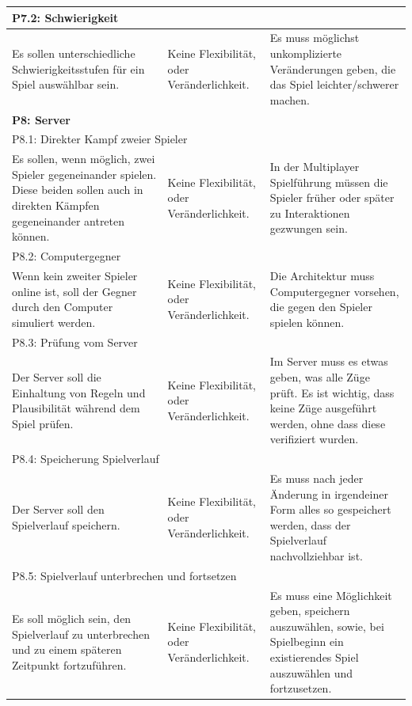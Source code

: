 \documentclass[fontsize=12pt,paper=a4,twoside]{scrartcl}
\begin{document}
\begin{longtable}[c]{|p{5cm}|p{5cm}|p{5cm}|}
\\ \hline
\multicolumn{3}{|l|}{{P7.2: Schwierigkeit}} 
\\ \hline
Es sollen unterschiedliche Schwierigkeitsstufen für ein Spiel auswählbar sein. & Keine Flexibilität, oder Veränderlichkeit.    & Es muss möglichst unkomplizierte Veränderungen geben, die das Spiel leichter/schwerer machen. 
\\ \hline
%
\multicolumn{3}{|l|}{{\textbf{P8: Server}}} 
\\ \hline
\multicolumn{3}{|l|}{{P8.1: Direkter Kampf zweier Spieler}} 
\\ \hline
Es sollen, wenn möglich, zwei Spieler gegeneinander spielen. Diese beiden sollen auch in direkten Kämpfen gegeneinander antreten können. & Keine Flexibilität, oder Veränderlichkeit.  & In der Multiplayer Spielführung müssen die Spieler früher oder später zu Interaktionen gezwungen sein. 
\\ \hline
\multicolumn{3}{|l|}{{P8.2: Computergegner}} 
\\ \hline
Wenn kein zweiter Spieler online ist, soll der Gegner durch den Computer simuliert werden. & Keine Flexibilität, oder Veränderlichkeit.    & Die Architektur muss Computergegner vorsehen, die gegen den Spieler spielen können. 
\\ \hline
\multicolumn{3}{|l|}{{P8.3: Prüfung vom Server}} 
\\ \hline
Der Server soll die Einhaltung von Regeln und Plausibilität während dem Spiel prüfen.  & Keine Flexibilität, oder Veränderlichkeit.    & Im Server muss es etwas geben, was alle Züge prüft. Es ist wichtig, dass keine Züge ausgeführt werden, ohne dass diese verifiziert wurden. 
\\ \hline
\multicolumn{3}{|l|}{{P8.4: Speicherung Spielverlauf}} 
\\ \hline
Der Server soll den Spielverlauf speichern. & Keine Flexibilität, oder Veränderlichkeit.    & Es muss nach jeder Änderung in irgendeiner Form alles so gespeichert werden, dass der Spielverlauf nachvollziehbar ist. 
\\ \hline
\multicolumn{3}{|l|}{{P8.5: Spielverlauf unterbrechen und fortsetzen}} 
\\ \hline
Es soll möglich sein, den Spielverlauf zu unterbrechen und zu einem späteren Zeitpunkt fortzuführen. & Keine Flexibilität, oder Veränderlichkeit.    & Es muss eine Möglichkeit geben, speichern auszuwählen, sowie, bei Spielbeginn ein existierendes Spiel auszuwählen und fortzusetzen. 
\\ \hline
\end{longtable}
\end{document}
